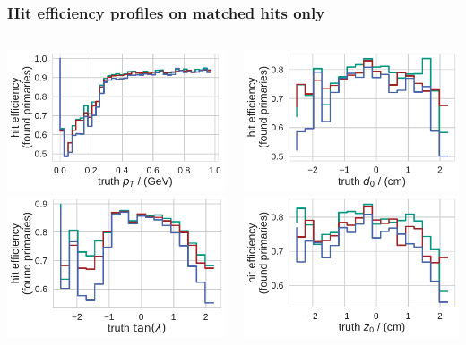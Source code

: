 \documentclass[18pt, aspectratio=169]{beamer}
\begin{document}
\begin{frame}
  \frametitle{Hit efficiency profiles on matched hits only}
  \begin{columns}
    \begin{column}{.5\textwidth}
      \centering
      \includegraphics[width=.65\textwidth]{figures/hiteff_on_matched_by_pt_truth_fullreco_trainedWithFakes.pdf}\\
      \includegraphics[width=.65\textwidth]{figures/hiteff_on_matched_by_tan_lambda_truth_fullreco_trainedWithFakes.pdf}
    \end{column}    
    \begin{column}{.5\textwidth}
      \centering
      \includegraphics[width=.65\textwidth]{figures/hiteff_on_matched_by_d0_truth_fullreco_trainedWithFakes.pdf}\\
      \includegraphics[width=.65\textwidth]{figures/hiteff_on_matched_by_z0_truth_fullreco_trainedWithFakes.pdf}

\end{column}
\end{columns}
\end{frame}
\end{document}

